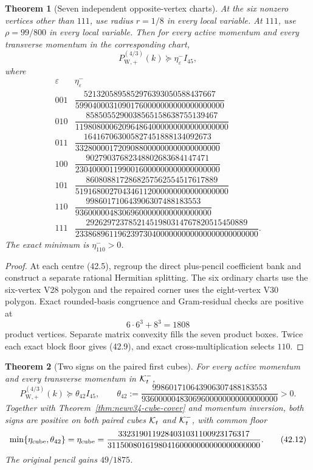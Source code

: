 \documentclass[11pt,oneside]{article}
\newtheorem{theorem}{Theorem}[section]
\theoremstyle{definition}
\theoremstyle{remark}
\begin{document}
\begin{theorem}[Seven independent opposite-vertex charts]
\label{thm:newv42-seven-charts}
At the six nonzero vertices other than \(111\), use radius \(r=1/8\)
in every local variable.  At \(111\), use
\(\rho=99/800\) in every local variable.  Then for every active
momentum and every transverse momentum in the corresponding chart,
\[
 P_{\mathrm W,+}^{(4/3)}(k)
 \succeq\eta_\varepsilon^-I_{45},                      \tag{42.8}
\]
where
\[
\begin{array}{c|c}
\varepsilon&\eta_\varepsilon^-\\ \hline
001&\dfrac{5213205895852976393050588437667}
{59904000310901760000000000000000000}\\[5pt]
010&\dfrac{8585055290038565158638755139467}
{119808000620964864000000000000000000}\\[5pt]
011&\dfrac{164167063005827451888134092673}
{3328000017209088000000000000000000}\\[5pt]
100&\dfrac{90279037682348802683684147471}
{2304000011990016000000000000000000}\\[5pt]
101&\dfrac{8608088172868257562554517617889}
{519168002704346112000000000000000000}\\[5pt]
110&\dfrac{998601710643906307488183553}
{93600000483069600000000000000000}\\[5pt]
111&\dfrac{29262972378521451980314767820515450889}
{2338689611962397304000000000000000000000000}.
\end{array}                                             \tag{42.9}
\]
The exact minimum is \(\eta_{110}^->0\).
\end{theorem}

\begin{proof}
At each centre (42.5), regroup the direct plus-pencil coefficient
bank and construct a separate rational Hermitian splitting.  The
six ordinary charts use the six-vertex V28 polygon and the repaired
corner uses the eight-vertex V30 polygon.  Exact rounded-basis
congruence and Gram-residual checks are positive at
\[
 6\cdot6^3+8^3=1808                                   \tag{42.10}
\]
product vertices.  Separate matrix convexity fills the seven
product boxes.  Twice each exact block floor gives (42.9), and exact
cross-multiplication selects \(110\).
\end{proof}

\begin{theorem}[Two signs on the paired first cubes]
\label{thm:newv42-paired-cubes}
For every active momentum and every transverse momentum in
\({\cal K}_t^-\),
\[
 P_{\mathrm W,+}^{(4/3)}(k)\succeq
 \theta_{42}I_{45},\qquad
 \theta_{42}:=
 \frac{998601710643906307488183553}
 {93600000483069600000000000000000}>0.                 \tag{42.11}
\]
Together with Theorem~\ref{thm:newv34-cube-cover} and momentum
inversion, both signs are positive on both paired cubes
\({\cal K}_t\) and \({\cal K}_t^-\), with common floor
\[
 \min\{\eta_{\rm cube},\theta_{42}\}
 =\eta_{\rm cube}
 =\frac{3323190119284031031100923176317}
 {311500801619804160000000000000000000}.               \tag{42.12}
\]
The original pencil gains \(49/1875\).
\end{theorem}
\end{document}
